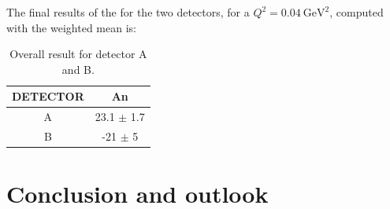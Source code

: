 The final results of the \transv for the two detectors, for a $Q^{2} = \SI{0.04}{\giga \electronvolt \squared}$, computed with the weighted mean is:

\begin{table}[h]
\centering
\begin{tabular}{c|c}
\hline
 DETECTOR   & An    \\
\hline
 A          & 23.1 $\pm$ 1.7  \\
 B          & -21 $\pm$ 5   \\
\hline
\end{tabular}
\caption{Overall result for detector A and B.}
\end{table}
 

\chapter{Conclusion and outlook} \label{conclusion}

